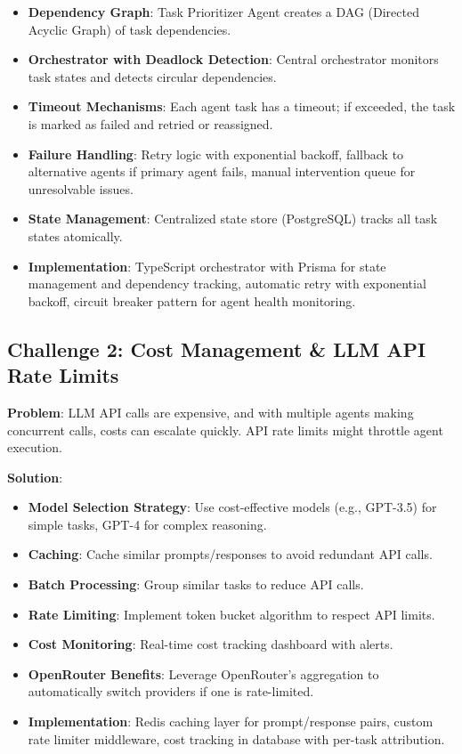 \documentclass[11pt,a4paper]{article}
\begin{document}
\begin{itemize}
  \item \textbf{Dependency Graph}: Task Prioritizer Agent creates a DAG (Directed Acyclic Graph) of task dependencies.
  \item \textbf{Orchestrator with Deadlock Detection}: Central orchestrator monitors task states and detects circular dependencies.
  \item \textbf{Timeout Mechanisms}: Each agent task has a timeout; if exceeded, the task is marked as failed and retried or reassigned.
  \item \textbf{Failure Handling}: Retry logic with exponential backoff, fallback to alternative agents if primary agent fails, manual intervention queue for unresolvable issues.
  \item \textbf{State Management}: Centralized state store (PostgreSQL) tracks all task states atomically.
  \item \textbf{Implementation}: TypeScript orchestrator with Prisma for state management and dependency tracking, automatic retry with exponential backoff, circuit breaker pattern for agent health monitoring.
\end{itemize}

\subsection{Challenge 2: Cost Management \& LLM API Rate Limits}

\textbf{Problem}: LLM API calls are expensive, and with multiple agents making concurrent calls, costs can escalate quickly. API rate limits might throttle agent execution.

\textbf{Solution}:

\begin{itemize}
  \item \textbf{Model Selection Strategy}: Use cost-effective models (e.g., GPT-3.5) for simple tasks, GPT-4 for complex reasoning.
  \item \textbf{Caching}: Cache similar prompts/responses to avoid redundant API calls.
  \item \textbf{Batch Processing}: Group similar tasks to reduce API calls.
  \item \textbf{Rate Limiting}: Implement token bucket algorithm to respect API limits.
  \item \textbf{Cost Monitoring}: Real-time cost tracking dashboard with alerts.
  \item \textbf{OpenRouter Benefits}: Leverage OpenRouter's aggregation to automatically switch providers if one is rate-limited.
  \item \textbf{Implementation}: Redis caching layer for prompt/response pairs, custom rate limiter middleware, cost tracking in database with per-task attribution.
\end{itemize}
\end{document}

